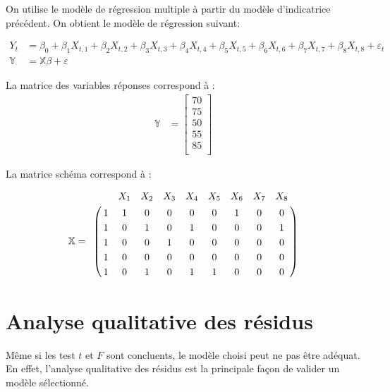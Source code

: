 \documentclass[11pt,french]{report}
\begin{document}
On utilise le modèle de régression multiple à partir du modèle d'indicatrice précédent. On obtient le modèle de régression suivant:

\begin{align*}
Y_t &= \beta_0 + \beta_1X_{t,1} + \beta_2X_{t,2} + \beta_3X_{t,3} 
+ \beta_4X_{t,4} + \beta_5X_{t,5} + \beta_6X_{t,6} + \beta_7X_{t,7} + \beta_8X_{t,8} + \varepsilon_t \\
\mathbb{Y} &= \mathbb{X}\mathbb{\beta} + \mathbb{\varepsilon}
\end{align*}

La matrice des variables réponses correspond à :
\begin{align*}
\mathbb{Y} &= 
\begin{bmatrix}
70 \\
75 \\
50 \\
55 \\
85 \\
\end{bmatrix}
\end{align*}

La matrice schéma correspond à :

\begin{align*}
\mathbb{X}
=
\bordermatrix { 
& &  X_1  & X_2 & X_3 & X_4 & X_5  & X_6 & X_7 & X_8 \cr 
& 1 & 1 & 0 & 0 & 0 & 0 & 1 & 0 & 0 \cr 
& 1 & 0 & 1 & 0 & 1 & 0 & 0 & 0 & 1 \cr 
& 1 & 0 & 0 & 1 & 0 & 0 & 0 & 0 & 0 \cr 
& 1 & 0 & 0 & 0 & 0 & 0 & 0 & 0 & 0 \cr 
& 1 & 0 & 1 & 0 & 1 & 1 & 0 & 0 & 0 \cr 
}
\end{align*}

\section{Analyse qualitative des résidus}
Même si les test $t$ et $F$ sont concluents, le modèle choisi peut ne pas être adéquat. En effet, l'analyse qualitative des résidus est la principale façon de valider un modèle sélectionné. 
\end{document}
